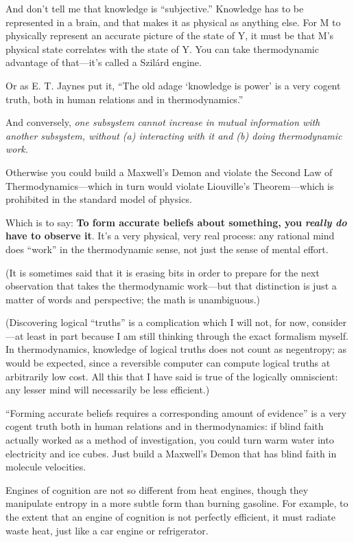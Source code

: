{
 And don't tell me that knowledge is
``subjective.'' Knowledge has to be
represented in a brain, and that makes it as physical as anything else.
For M to physically represent an accurate picture of the state of Y, it
must be that M's physical state correlates with the
state of Y. You can take thermodynamic advantage of
that---it's called a Szilárd engine.}

{
 Or as E. T. Jaynes put it, ``The old adage
`knowledge is power' is a very cogent
truth, both in human relations and in
thermodynamics.''}

{
 And conversely, \textit{one subsystem cannot increase in mutual
information with another subsystem, without (a) interacting with it and
(b) doing thermodynamic work.}}

{
 Otherwise you could build a Maxwell's Demon and
violate the Second Law of Thermodynamics---which in turn would violate
Liouville's Theorem---which is prohibited in the
standard model of physics.}

{
 Which is to say: \textbf{To form accurate beliefs about something,
you }\textbf{\textit{really do}}\textbf{ have to observe it}.
It's a very physical, very real process: any rational
mind does ``work'' in the
thermodynamic sense, not just the sense of mental effort.}

{
 (It is sometimes said that it is erasing bits in order to prepare
for the next observation that takes the thermodynamic work---but that
distinction is just a matter of words and perspective; the math is
unambiguous.)}

{
 (Discovering logical ``truths''
is a complication which I will not, for now, consider---at least in
part because I am still thinking through the exact formalism myself. In
thermodynamics, knowledge of logical truths does not count as
negentropy; as would be expected, since a reversible computer can
compute logical truths at arbitrarily low cost. All this that I have
said is true of the logically omniscient: any lesser mind will
necessarily be less efficient.)}

{
 ``Forming accurate beliefs requires a
corresponding amount of evidence'' is a very cogent
truth both in human relations and in thermodynamics: if blind faith
actually worked as a method of investigation, you could turn warm water
into electricity and ice cubes. Just build a Maxwell's
Demon that has blind faith in molecule velocities.}

{
 Engines of cognition are not so different from heat engines,
though they manipulate entropy in a more subtle form than burning
gasoline. For example, to the extent that an engine of cognition is not
perfectly efficient, it must radiate waste heat, just like a car engine
or refrigerator.}


